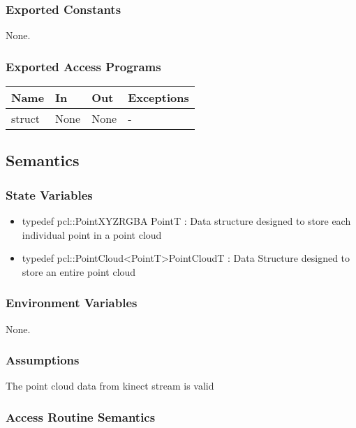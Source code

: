 \documentclass[12pt, titlepage]{article}
\begin{document}
\subsubsection{Exported Constants}

None.

\subsubsection{Exported Access Programs}

\begin{center}
\begin{tabular}{p{2cm} p{4cm} p{4cm} p{2cm}}
\hline
\textbf{Name} & \textbf{In} & \textbf{Out} & \textbf{Exceptions} \\
\hline
struct & None & None & - \\
\hline
\end{tabular}
\end{center}

\subsection{Semantics}

\subsubsection{State Variables}

\begin{itemize}
\item typedef pcl::PointXYZRGBA PointT : Data structure designed to store each individual point in a point cloud 
\item typedef pcl::PointCloud\textless PointT\textgreater PointCloudT : Data Structure designed to store an entire point cloud
\end{itemize}

\subsubsection{Environment Variables}

None.

\subsubsection{Assumptions}

The point cloud data from kinect stream is valid

\subsubsection{Access Routine Semantics}
\end{document}
